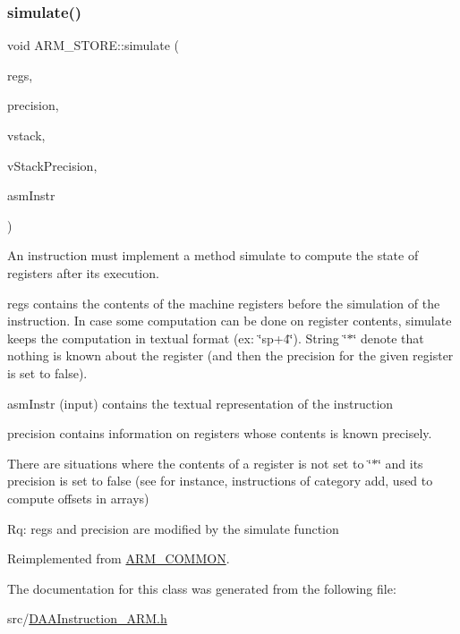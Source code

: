 \subsubsection{\texorpdfstring{simulate()}{simulate()}}
{\footnotesize\ttfamily void A\+R\+M\+\_\+\+S\+T\+O\+R\+E\+::simulate (\begin{DoxyParamCaption}\item[{\hyperlink{DAAInstruction_8h_af0fae93a861de9cf37988d5673cac523}{reg\+Table} \&}]{regs,  }\item[{\hyperlink{DAAInstruction_8h_a0e8cae02815a5f8adc750122d790b455}{reg\+Precision\+Table} \&}]{precision,  }\item[{\hyperlink{DAAInstruction_8h_a1b0e70ac1a04f06c8132055ed01f589f}{stack\+Type} \&}]{vstack,  }\item[{\hyperlink{DAAInstruction_8h_ac5cb793e9dac3fa9693da78b7e29ab30}{stack\+Prec\+Type} \&}]{v\+Stack\+Precision,  }\item[{const string \&}]{asm\+Instr }\end{DoxyParamCaption})\hspace{0.3cm}{\ttfamily [virtual]}}

An instruction must implement a method simulate to compute the state of registers after its execution.

regs contains the contents of the machine registers before the simulation of the instruction. In case some computation can be done on register contents, simulate keeps the computation in textual format (ex\+: \char`\"{}sp+4\char`\"{}). String \char`\"{}$\ast$\char`\"{} denote that nothing is known about the register (and then the precision for the given register is set to false).

asm\+Instr (input) contains the textual representation of the instruction

precision contains information on registers whose contents is known precisely.

There are situations where the contents of a register is not set to \char`\"{}$\ast$\char`\"{} and its precision is set to false (see for instance, instructions of category add, used to compute offsets in arrays)

Rq\+: regs and precision are modified by the simulate function 

Reimplemented from \hyperlink{classARM__COMMON_a89eb552311ce787557a976aee2fa2db6}{A\+R\+M\+\_\+\+C\+O\+M\+M\+ON}.



The documentation for this class was generated from the following file\+:\begin{DoxyCompactItemize}
\item 
src/\hyperlink{DAAInstruction__ARM_8h}{D\+A\+A\+Instruction\+\_\+\+A\+R\+M.\+h}\end{DoxyCompactItemize}
